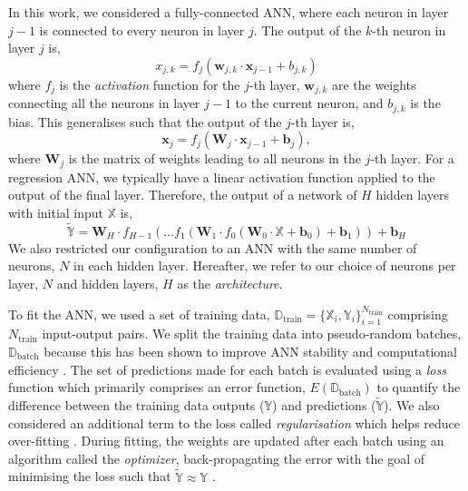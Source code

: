 \documentclass[a4paper,fleqn,usenatbib]{mnras}
\begin{document}
In this work, we considered a fully-connected ANN, where each neuron in layer $j-1$ is connected to every neuron in layer $j$. The output of the $k$-th neuron in layer $j$ is, 
%
\begin{equation}
    x_{j, k}=f_j(\boldsymbol{w}_{j, k} \cdot \boldsymbol{x}_{j-1} + b_{j, k})
\end{equation}
%
where $f_j$ is the \emph{activation} function for the $j$-th layer, $\boldsymbol{w}_{j, k}$ are the weights connecting all the neurons in layer $j-1$ to the current neuron, and $b_{j, k}$ is the bias. This generalises such that the output of the $j$-th layer is,
%
\begin{equation}
    \boldsymbol{x}_{j}=f_j(\boldsymbol{W}_{j} \cdot \boldsymbol{x}_{j-1} + \boldsymbol{b}_{j}),
\end{equation}
%
where $\boldsymbol{W}_j$ is the matrix of weights leading to all neurons in the $j$-th layer. For a regression ANN, we typically have a linear activation function applied to the output of the final layer. Therefore, the output of a network of $H$ hidden layers with initial input $\boldsymbol{\mathbb{X}}$ is,
%
\begin{equation}
    \widetilde{\boldsymbol{\mathbb{Y}}} = \boldsymbol{W}_{H} \cdot f_{H-1}(\dots f_1(\boldsymbol{W}_1 \cdot f_0(\boldsymbol{W}_{0} \cdot \boldsymbol{\mathbb{X}} + \boldsymbol{b}_{0}) + \boldsymbol{b}_1) ) + \boldsymbol{b}_{H}
\end{equation}
%
We also restricted our configuration to an ANN with the same number of neurons, $N$ in each hidden layer. Hereafter, we refer to our choice of neurons per layer, $N$ and hidden layers, $H$ as the \emph{architecture}.

To fit the ANN, we used a set of training data, $\boldsymbol{\mathbb{D}}_\mathrm{train} = \{\boldsymbol{\mathbb{X}}_i, \boldsymbol{\mathbb{Y}}_i\}_{i=1}^{N_\mathrm{train}}$ comprising $N_\mathrm{train}$ input-output pairs. We split the training data into pseudo-random batches, $\boldsymbol{\mathbb{D}}_\mathrm{batch}$ because this has been shown to improve ANN stability and computational efficiency \citep{Masters.Luschi2018}. The set of predictions made for each batch is evaluated using a \emph{loss} function which primarily comprises an error function, $E(\boldsymbol{\mathbb{D}}_\mathrm{batch})$ to quantify the difference between the training data outputs ($\boldsymbol{\mathbb{Y}}$) and predictions ($\widetilde{\boldsymbol{\mathbb{Y}}}$). We also considered an additional term to the loss called \emph{regularisation} which helps reduce over-fitting \citep{Goodfellow.Bengio.ea2016}. During fitting, the weights are updated after each batch using an algorithm called the \emph{optimizer}, back-propagating the error with the goal of minimising the loss such that $\widetilde{\boldsymbol{\mathbb{Y}}} \approx \boldsymbol{\mathbb{Y}}$ \citep[see e.g.][]{Rumelhart.Hinton.ea1986}.
\end{document}
